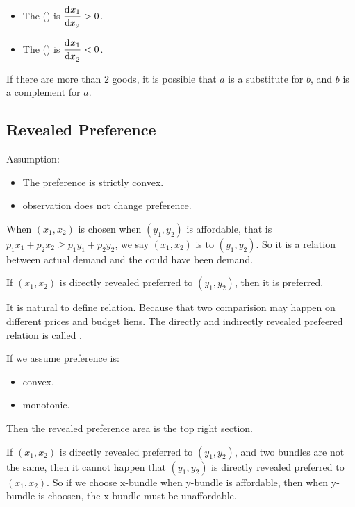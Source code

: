 \begin{itemize}
    \item The  () is $\dod{x_1}{x_2} > 0$.
    \item The  () is $\dod{x_1}{x_2} < 0$.
\end{itemize}

If there are more than 2 goods, it is possible that $a$ is a substitute for $b$, and $b$ is a complement for $a$.



\subsection{Revealed Preference}

Assumption:
\begin{itemize}
    \item The preference is strictly convex.
    \item observation does not change preference.
\end{itemize}

When $(x_1,x_2)$ is chosen when $(y_1,y_2)$ is affordable, that is $p_1 x_1 + p_2 x_2 \geq p_1 y_1 + p_2 y_2$, we say $(x_1,x_2)$ is  to $(y_1,y_2)$. So it is a relation between actual demand and the could have been demand.

\begin{theorem}
    If $(x_1,x_2)$ is directly revealed preferred to $(y_1,y_2)$, then it is preferred.
\end{theorem}

It is natural to define  relation. Because that two comparision may happen on different prices and budget liens. The directly and indirectly revealed prefeered relation is called .

If we assume preference is:
\begin{itemize}
    \item convex.
    \item monotonic.
\end{itemize}
Then the revealed preference area is the top right section.

\begin{theorem}
    If $(x_1,x_2)$ is directly revealed preferred to $(y_1,y_2)$, and two bundles are not the same, then it cannot happen that $(y_1,y_2)$ is directly revealed preferred to $(x_1,x_2)$. So if we choose x-bundle when y-bundle is affordable, then when y-bundle is choosen, the x-bundle must be unaffordable.
\end{theorem}

